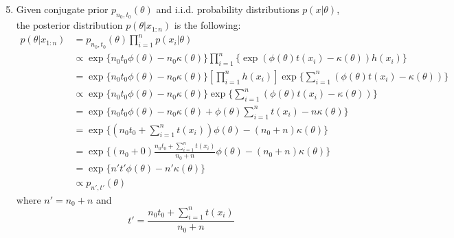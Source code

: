 \documentclass{article}
\begin{document}
\begin{enumerate}
\setcounter{enumi}{4}
\item Given conjugate prior $p_{n_0,t_0}(\theta)$ and i.i.d. probability distributions $p(x|\theta)$, the posterior distribution $p(\theta|x_{1:n})$ is the following:
\begin{align*}
p(\theta|x_{1:n}) &= p_{n_0,t_0}(\theta) \prod\limits_{i=1}^{n} p(x_i|\theta) \\
&\propto \exp\{n_0t_0\phi(\theta)-n_0\kappa(\theta)\} \prod\limits_{i=1}^{n} \{\exp(\phi(\theta)t(x_i) - \kappa(\theta))h(x_i) \}\\
&=\exp\{n_0t_0\phi(\theta)-n_0\kappa(\theta)\} [\prod\limits_{i=1}^{n}h(x_i)]\exp\{\sum\limits_{i=1}^{n}(\phi(\theta)t(x_i) - \kappa(\theta)) \} \\
&\propto \exp\{n_0t_0\phi(\theta)-n_0\kappa(\theta)\} \exp\{\sum\limits_{i=1}^{n}(\phi(\theta)t(x_i) - \kappa(\theta)) \} \\
&=\exp\{n_0t_0\phi(\theta)-n_0\kappa(\theta) + \phi(\theta)\sum\limits_{i=1}^{n} t(x_i) - n\kappa(\theta) \} \\
&=\exp\{ (n_0t_0+\sum\limits_{i=1}^{n}t(x_i))\phi(\theta)-(n_0+n)\kappa(\theta)\}\\
&=\exp\{(n_0+0)\frac{n_0t_0+\sum\limits_{i=1}^{n}t(x_i)}{n_0+n} \phi(\theta) - (n_0+n)\kappa(\theta) \} \\
&=\exp\{n't'\phi(\theta)-n'\kappa(\theta)\} \\
&\propto p_{n',t'}(\theta)
\end{align*}
where $n'=n_0+n$ and
$$ t'=\frac{n_0t_0+\sum\limits_{i=1}^{n}t(x_i)}{n_0+n}$$


\end{enumerate}
\end{document}
